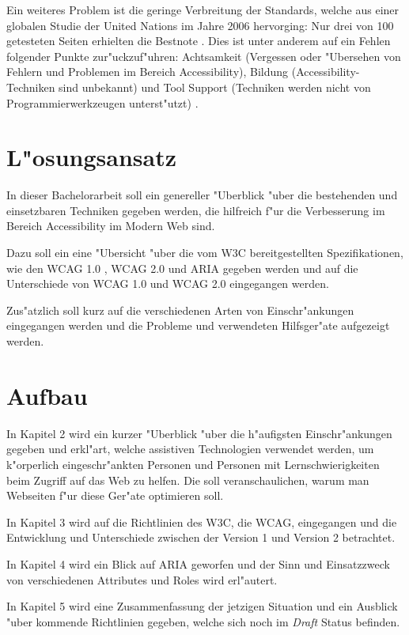 \documentclass[a4paper,bibtotoc,oneside]{scrbook}
\begin{document}
Ein weiteres Problem ist die geringe Verbreitung der Standards, welche aus einer globalen Studie der United Nations im Jahre 2006 hervorging\cite{acc_report}: Nur drei von 100 getesteten Seiten erhielten die Bestnote \cite [S. 7]{acc_report}. Dies ist unter anderem auf ein Fehlen folgender Punkte zur"uckzuf"uhren: Achtsamkeit (Vergessen oder "Ubersehen von Fehlern und Problemen im Bereich Accessibility), Bildung (Accessibility-Techniken sind unbekannt) und Tool Support (Techniken werden nicht von Programmierwerkzeugen unterst"utzt) \cite[S. 13]{tool_acc}.


\section{L"osungsansatz}
In dieser Bachelorarbeit soll ein genereller "Uberblick "uber die bestehenden und einsetzbaren Techniken gegeben werden, die hilfreich f"ur die Verbesserung im Bereich Accessibility im Modern Web sind. 

Dazu soll ein eine "Ubersicht "uber die vom W3C bereitgestellten Spezifikationen, wie den WCAG 1.0 \cite{wcag1}, WCAG 2.0 \cite{wcag2} und ARIA \cite{aria} gegeben werden und auf die Unterschiede von WCAG 1.0 und WCAG 2.0 eingegangen werden.

Zus"atzlich soll kurz auf die verschiedenen Arten von Einschr"ankungen eingegangen werden und die Probleme und verwendeten Hilfsger"ate aufgezeigt werden.

\section{Aufbau}
In Kapitel 2 wird ein kurzer "Uberblick "uber die h"aufigsten Einschr"ankungen gegeben und erkl"art, welche assistiven Technologien verwendet werden, um k"orperlich eingeschr"ankten Personen und Personen mit Lernschwierigkeiten beim Zugriff auf das Web zu helfen. Die soll veranschaulichen, warum man Webseiten f"ur diese Ger"ate optimieren soll.

In Kapitel 3 wird auf die Richtlinien des W3C, die WCAG, eingegangen und die Entwicklung und Unterschiede zwischen der Version 1 und Version 2 betrachtet.

In Kapitel 4 wird ein Blick auf ARIA geworfen und der Sinn und Einsatzzweck von verschiedenen Attributes und Roles wird erl"autert.

In Kapitel 5 wird eine Zusammenfassung der jetzigen Situation und ein Ausblick "uber kommende Richtlinien gegeben, welche sich noch im \emph{Draft} Status befinden.
\end{document}
